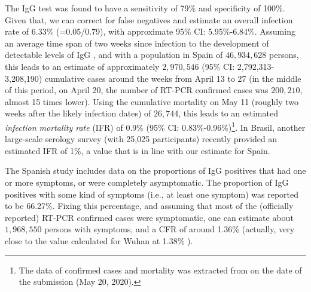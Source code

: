 \documentclass{article}
\newcommand{\af}[1]{{#1}}
\newcommand{\cb}[1]{{#1}}
\newcommand{\hh}[1]{{#1}}
\begin{document}
The IgG test was found to have a sensitivity of 79\% and specificity of 100\%. Given that, we can correct for false negatives and estimate an overall infection rate of 6.33\% (=0.05/0.79), \hh{with approximate 95\% CI: 5.95\%-6.84\%}. Assuming an average time span of two weeks since infection to the development of detectable levels of IgG \cite{long2020antibody}, and with a population in Spain of $46,934,628$ persons, this leads to an estimate of approximately $2,970,546$ \hh{(95\% CI: 2,792,313-3,208,190)} cumulative cases around the weeks from April 13 to 27 (in the middle of this period, on April 20, the number of RT-PCR confirmed cases was $200,210$, almost 15 times lower). Using the cumulative mortality on May 11 (roughly two weeks after the likely infection dates) of $26,744$, this leads to an estimated \emph{infection mortality rate} (IFR) of 0.9\% \hh{(95\% CI: 0.83\%-0.96\%)}\footnote{\hh{The data of confirmed cases and mortality was extracted from \cite{ECDC} on the date of the submission (May 20, 2020).}}. \cb{In Brasil, another large-scale serology survey (with 25,025 participants) \cite{Hallal2020.05.30.20117531} recently provided an estimated IFR of 1\%, a value that is in line with our estimate for Spain.}



The Spanish study includes data on the proportions of IgG positives that had one or more symptoms, or were completely asymptomatic. The proportion of IgG positives with some kind of symptoms (i.e., at least one symptom) \hh{was reported to be 66.27\%. Fixing this percentage, and assuming that most of the (officially reported) RT-PCR confirmed cases were symptomatic}, one can estimate about $1,968,550$ persons with symptoms, and a CFR of around 1.36\% (actually, very close to the value calculated for Wuhan at 1.38\% \cite{Verity2020}).
\end{document}
